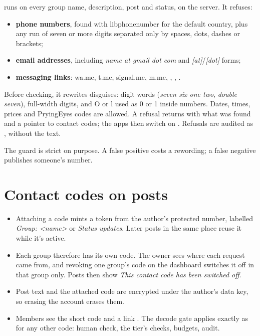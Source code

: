  runs on every group name, description, post and status, on the server. It refuses:
\begin{itemize}
  \item \textbf{phone numbers}, found with libphonenumber for the default country, plus any run of seven or more digits separated only by spaces, dots, dashes or brackets;
  \item \textbf{email addresses}, including \emph{name at gmail dot com} and \emph{[at]}/\emph{[dot]} forms;
  \item \textbf{messaging links}: wa.me, t.me, signal.me, m.me, , , .
\end{itemize}
Before checking, it rewrites disguises: digit words (\emph{seven six one two}, \emph{double seven}), full-width digits, and O or l used as 0 or 1 inside numbers. Dates, times, prices and PryingEyes codes are allowed. A refusal returns  with what was found and a pointer to contact codes; the apps then switch on . Refusals are audited as , without the text.

The guard is strict on purpose. A false positive costs a rewording; a false negative publishes someone's number.

\section{Contact codes on posts}

\begin{itemize}
  \item Attaching a code mints a token from the author's protected number, labelled \emph{Group: <name>} or \emph{Status updates}. Later posts in the same place reuse it while it's active.
  \item Each group therefore has its own code. The owner sees where each request came from, and revoking one group's code on the dashboard switches it off in that group only. Posts then show \emph{This contact code has been switched off}.
  \item Post text and the attached code are encrypted under the author's data key, so erasing the account erases them.
  \item Members see the short code and a link . The decode gate applies exactly as for any other code: human check, the tier's checks, budgets, audit.
\end{itemize}

